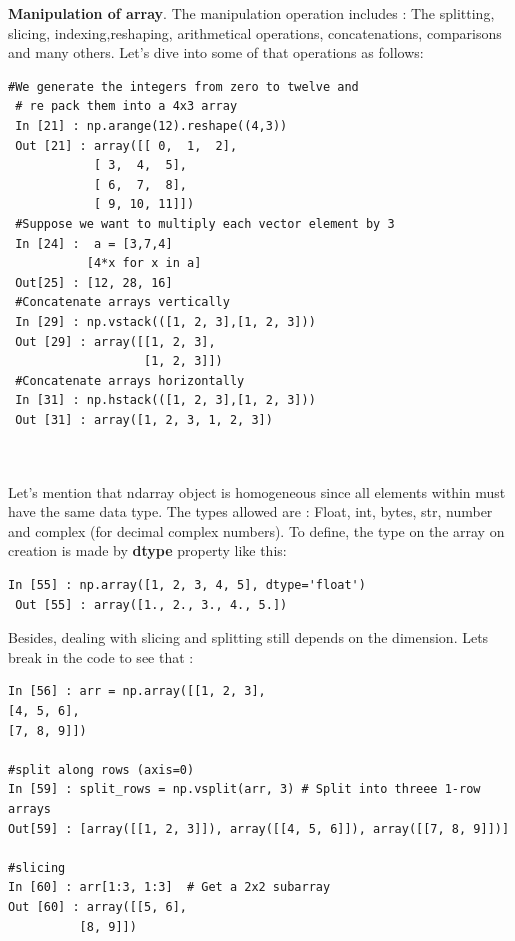 \documentclass[12pt,a4paper]{report}
\begin{document}
 \noindent\textbf{Manipulation of array}. \newline
  The manipulation operation includes : The splitting, slicing, indexing,reshaping, arithmetical operations, concatenations, comparisons and many others. Let's dive into some of that operations as follows:
 \begin{lstlisting}[style=stylepython] 
 #We generate the integers from zero to twelve and
 # re pack them into a 4x3 array
 In [21] : np.arange(12).reshape((4,3))  
 Out [21] : array([[ 0,  1,  2],
 		    [ 3,  4,  5],
 		    [ 6,  7,  8],
 		    [ 9, 10, 11]]) 
 #Suppose we want to multiply each vector element by 3
 In [24] :  a = [3,7,4] 
           [4*x for x in a]
 Out[25] : [12, 28, 16]  
 #Concatenate arrays vertically  
 In [29] : np.vstack(([1, 2, 3],[1, 2, 3]))  
 Out [29] : array([[1, 2, 3],
                   [1, 2, 3]]) 
 #Concatenate arrays horizontally
 In [31] : np.hstack(([1, 2, 3],[1, 2, 3]))
 Out [31] : array([1, 2, 3, 1, 2, 3])   
 
 
 \end{lstlisting} 
 Let's mention that ndarray object is homogeneous since all elements within must have the same data type. The types allowed are : Float, int, bytes, str, number and complex (for decimal complex numbers). To define, the type on the array on creation is made by \textbf{dtype} property like this: 
\begin{lstlisting}[style=stylepython] 
 In [55] : np.array([1, 2, 3, 4, 5], dtype='float') 
 Out [55] : array([1., 2., 3., 4., 5.]) 
\end{lstlisting} 

Besides, dealing with slicing and splitting still depends on the dimension. Lets break in the code to see that : 
\begin{lstlisting}[style=stylepython]
In [56] : arr = np.array([[1, 2, 3],
[4, 5, 6],
[7, 8, 9]]) 

#split along rows (axis=0)
In [59] : split_rows = np.vsplit(arr, 3) # Split into threee 1-row arrays
Out[59] : [array([[1, 2, 3]]), array([[4, 5, 6]]), array([[7, 8, 9]])]

#slicing 
In [60] : arr[1:3, 1:3]  # Get a 2x2 subarray
Out [60] : array([[5, 6],
		  [8, 9]])
\end{lstlisting}   
 

  


 
 
  
  
 
 




\newpage
  
	
	
	
	\newpage	
	
	
	
	
	
	
	
\end{document}
